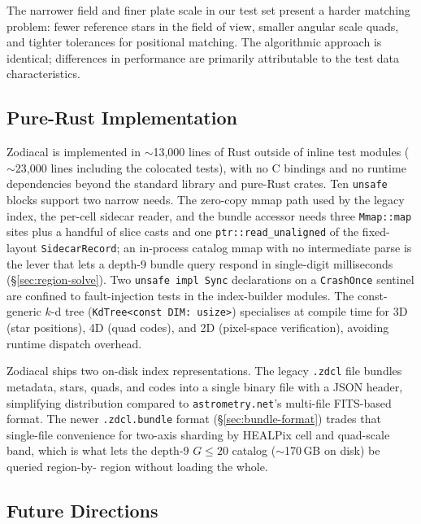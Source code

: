 \documentclass[twocolumn, 10pt]{article}
\begin{document}
The narrower field and finer plate scale in our test set present a
harder matching problem: fewer reference stars in the field of view,
smaller angular scale quads, and tighter tolerances for positional
matching. The algorithmic approach is identical; differences in
performance are primarily attributable to the test data characteristics.

\subsection{Pure-Rust Implementation}

Zodiacal is implemented in $\sim$13{,}000 lines of Rust outside of
inline test modules ($\sim$23{,}000 lines including the colocated
tests), with no C bindings and no runtime dependencies beyond the
standard library and pure-Rust crates. Ten \texttt{unsafe} blocks
support two narrow needs. The zero-copy mmap path used by the
legacy index, the per-cell sidecar reader, and the bundle accessor
needs three \texttt{Mmap::map} sites plus a handful of slice casts
and one \texttt{ptr::read\_unaligned} of the fixed-layout
\texttt{SidecarRecord}; an in-process catalog mmap with no
intermediate parse is the lever that lets a depth-9 bundle query
respond in single-digit milliseconds (\S\ref{sec:region-solve}).
Two \texttt{unsafe impl Sync} declarations on a \texttt{CrashOnce}
sentinel are confined to fault-injection tests in the index-builder
modules. The const-generic $k$-d tree (\texttt{KdTree<const DIM:
usize>}) specialises at compile time for 3D (star positions), 4D
(quad codes), and 2D (pixel-space verification), avoiding runtime
dispatch overhead.

Zodiacal ships two on-disk index representations. The legacy
\texttt{.zdcl} file bundles metadata, stars, quads, and codes into a
single binary file with a JSON header, simplifying distribution
compared to \texttt{astrometry.net}'s multi-file FITS-based format.
The newer \texttt{.zdcl.bundle} format (\S\ref{sec:bundle-format})
trades that single-file convenience for two-axis sharding by
HEALPix cell and quad-scale band, which is what lets the depth-9
$G \le 20$ catalog ($\sim$170\,GB on disk) be queried region-by-
region without loading the whole.

\subsection{Future Directions}
\end{document}
